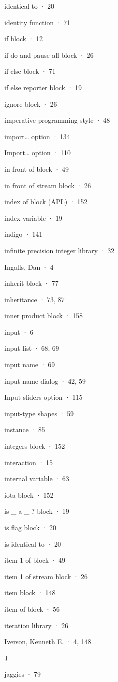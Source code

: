 \documentclass[
  letterpaper,
]{book}
\begin{document}
identical to · 20

identity function · 71

if block · 12

if do and pause all block · 26

if else block · 71

if else reporter block · 19

ignore block · 26

imperative programming style · 48

import\ldots{} option · 134

Import\ldots{} option · 110

in front of block · 49

in front of stream block · 26

index of block (APL) · 152

index variable · 19

indigo · 141

infinite precision integer library · 32

Ingalls, Dan · 4

inherit block · 77

inheritance · 73, 87

inner product block · 158

input · 6

input list · 68, 69

input name · 69

input name dialog · 42, 59

Input sliders option · 115

input-type shapes · 59

instance · 85

integers block · 152

interaction · 15

internal variable · 63

iota block · 152

is \_ a \_ ? block · 19

is flag block · 20

is identical to · 20

item 1 of block · 49

item 1 of stream block · 26

item block · 148

item of block · 56

iteration library · 26

Iverson, Kenneth E. · 4, 148

J

jaggies · 79
\end{document}
